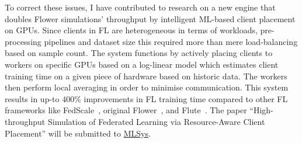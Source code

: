 To correct these issues, I have contributed to research on a new engine that doubles Flower simulations' throughput by intelligent ML-based client placement on GPUs. Since clients in FL are heterogeneous in terms of workloads, pre-processing pipelines and dataset size this required more than mere load-balancing based on sample count. The system functions by actively placing clients to workers on specific GPUs based on a log-linear model which estimates client training time on a given piece of hardware based on historic data. The workers then perform local averaging in order to minimise communication. This system results in up-to $400\%$ improvements in FL training time compared to other FL frameworks like FedScale~\citep{FedScale}, original Flower~\citep{Flower}, and Flute~\citep{Flute}. The paper ``High-throughput Simulation of Federated Learning via Resource-Aware Client Placement'' will be submitted to \href{https://mlsys.org/}{MLSys}.

